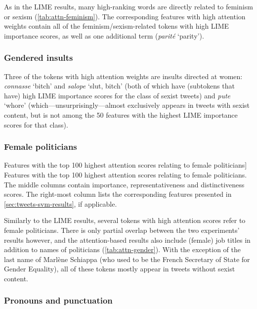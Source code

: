 As in the LIME results, many high-ranking words are directly related to feminism or sexism (\autoref{tab:attn-feminism}).
The corresponding features with high attention weights contain all of the feminism/sexism-related tokens with high LIME importance scores, as well as one additional term (\textit{parité} `parity').

\subsubsection{Gendered insults}

Three of the tokens with high attention weights are insults directed at women: \textit{connasse} `bitch' and \textit{salope} `slut, bitch' (both of which have (subtokens that have) high LIME importance scores for the class of sexist tweets) and \textit{pute} `whore' (which---unsurprisingly---almost exclusively appears in tweets with sexist content, but is not among the 50 features with the highest LIME importance scores for that class).

\subsubsection{Female politicians}
\begin{table}[htbp]
    
    \caption
    [Features with the top 100 highest attention scores relating to female politicians]
    {Features with the top 100 highest attention scores relating to female politicians.
    The middle columns contain importance, representativeness and distinctiveness scores.
    The right-most column lists the corresponding features presented in \autoref{sec:tweets-svm-results}, if applicable.
    }
    \label{tab:attn-politicians}
\end{table}

Similarly to the LIME results, several tokens with high attention scores refer to female politicians.
There is only partial overlap between the two experiments' results however, and the attention-based results also include (female) job titles in addition to names of politicians (\autoref{tab:attn-gender}).
With the exception of the last name of Marlène Schiappa (who used to be the French Secretary of State for Gender Equality), all of these tokens mostly appear in tweets without sexist content. 

\subsubsection{Pronouns and punctuation}

